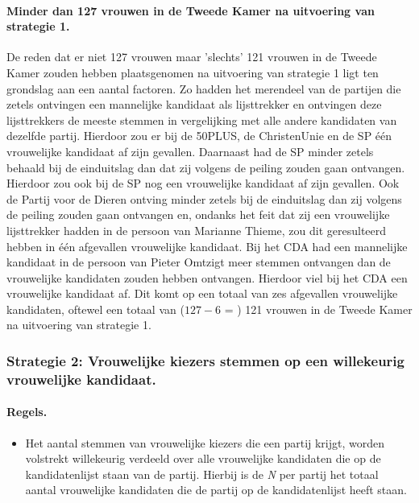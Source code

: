 \paragraph{Minder dan 127 vrouwen in de Tweede Kamer na uitvoering van strategie 1.}
De reden dat er niet 127 vrouwen maar 'slechts' 121 vrouwen in de Tweede Kamer zouden hebben plaatsgenomen na uitvoering van strategie 1 ligt ten grondslag aan een aantal factoren. Zo hadden het merendeel van de partijen die zetels ontvingen een mannelijke kandidaat als lijsttrekker en ontvingen deze lijsttrekkers de meeste stemmen in vergelijking met alle andere kandidaten van dezelfde partij. Hierdoor zou er bij de 50PLUS, de ChristenUnie en de SP één vrouwelijke kandidaat af zijn gevallen. Daarnaast had de SP minder zetels behaald bij de einduitslag dan dat zij volgens de peiling zouden gaan ontvangen. Hierdoor zou ook bij de SP nog een vrouwelijke kandidaat af zijn gevallen. Ook de Partij voor de Dieren ontving minder zetels bij de einduitslag dan zij volgens de peiling zouden gaan ontvangen en, ondanks het feit dat zij een vrouwelijke lijsttrekker hadden in de persoon van Marianne Thieme, zou dit geresulteerd hebben in één afgevallen vrouwelijke kandidaat. Bij het CDA had een mannelijke kandidaat in de persoon van Pieter Omtzigt meer stemmen ontvangen dan de vrouwelijke kandidaten zouden hebben ontvangen. Hierdoor viel bij het CDA een vrouwelijke kandidaat af. Dit komt op een totaal van zes afgevallen vrouwelijke kandidaten, oftewel een totaal van ($127-6$ = ) 121 vrouwen in de Tweede Kamer na uitvoering van strategie 1.  



\subsubsection{Strategie 2: Vrouwelijke kiezers stemmen op een willekeurig vrouwelijke kandidaat.}
\paragraph{Regels.}
\begin{itemize}
	\item
Het aantal stemmen van vrouwelijke kiezers die een partij krijgt, worden volstrekt willekeurig verdeeld over alle vrouwelijke kandidaten die op de kandidatenlijst staan van de partij. Hierbij is de \textit{N} per partij het totaal aantal vrouwelijke kandidaten die de partij op de kandidatenlijst heeft staan. 	\\ 	
\end{itemize}	

